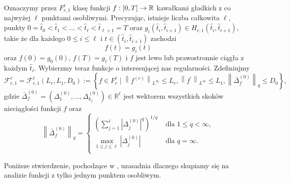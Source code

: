 \documentclass[oik, pdftex, man]{mgrwms}
\begin{document}
    Oznaczymy przez $F_{r, 1}^{\ell}$ klasę funkcji $f: [0,T] \rightarrow \mathbb{R}$ kawałkami gładkich z co najwyżej $\ell$ punktami osobliwymi. Precyzując, istnieje liczba całkowita $\ell$, punkty $0 = \hat{t}_{0} < \hat{t}_{1} < \ldots < \hat{t}_{\ell} < \hat{t}_{\ell + 1} = T$ oraz $g_{i}(\hat{t}_{i}, \hat{t}_{i+1}) \in H_{r, 1}(\hat{t}_{i},\hat{t}_{i+1})$, takie że dla każdego $0 \leq i \leq \ell$ i $t \in (\hat{t}_{i}, \hat{t}_{i+1})$ zachodzi
    \begin{equation*}
        f(t) = g_{i}(t)
    \end{equation*}
    oraz $f(0) = g_{0}(0)$, $f(T) = g_{\ell}(T)$ i $f$ jest lewo lub prawostronnie ciągła z każdym $\hat{t}_{i}$.
    Wybierzmy teraz funkcje o interesującej nas regularności. Zdefiniujmy
    \begin{equation*}
        \mathcal{F}_{r, 1}^{\ell}=\mathcal{F}_{r, 1}^{\ell}\left(L_{r}, L_{1}, D_{0}\right):=\left\{f \in F_{r}^{\ell} \mid\left\|f^{(r)}\right\|_{L^{\infty}} \leq L_{r},\left\|f^{\prime}\right\|_{L^{\infty}} \leq L_{1},\left\|\bar{\Delta}_{f}^{(0)}\right\|_{q} \leq D_{0}\right\},
    \end{equation*}
    gdzie $\bar{\Delta}_{f}^{(0)}=\left(\Delta_{1}^{(0)}, \ldots, \Delta_{k_{f}}^{(0)}\right) \in \mathbb{R}^{\ell}$ jest wektorem wszystkich skoków nieciągłości funkcji $f$ oraz
    \begin{equation*}
        \left\|\bar{\Delta}_{f}^{(0)}\right\|_{q}=\begin{cases}
            \displaystyle \left(\sum_{j=1}^{\ell}\left|\Delta_{j}^{(0)}\right|^{q}\right)^{1 / q}   & \text { dla } 1 \leq q< \infty, \\
            \displaystyle \max _{1 \leq j \leq \ell}\left|\Delta_{j}^{(0)}\right|                   & \text { dla } q = \infty. \\
        \end{cases}
    \end{equation*}
    
    Poniższe stwierdzenie, pochodzące w \cite{PoA}, uzasadnia dlaczego skupiamy się na analizie funkcji z tylko jednym punktem osobliwym.
\end{document}
